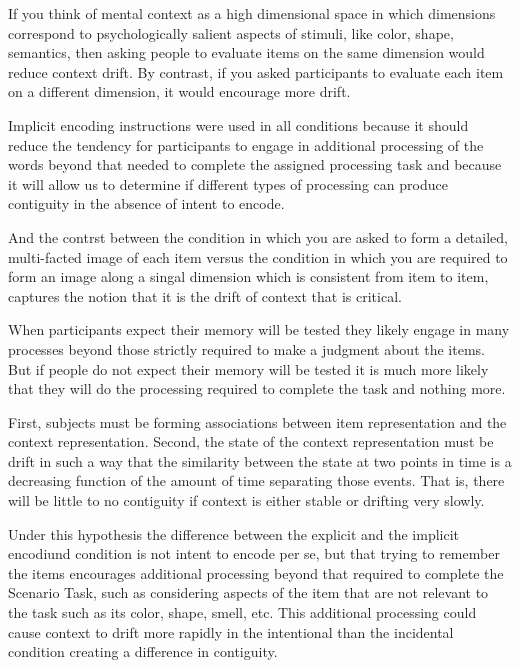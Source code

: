 If you think of mental context as a high dimensional space in which dimensions correspond to psychologically salient aspects of stimuli, like color, shape, semantics, then asking people to evaluate items on the same dimension would reduce context drift. By contrast, if you asked participants to evaluate each item on a different dimension, it would encourage more drift.


Implicit encoding instructions were used in all conditions because it should reduce the tendency for participants to engage in additional processing of the words beyond that needed to complete the assigned processing task and because it will allow us to determine if different types of processing can produce contiguity in the absence of intent to encode.




And the contrst between the condition in which you are asked to form a detailed, multi-facted image of each item versus the condition in which you are required to form an image along a singal dimension which is consistent from item to item, captures the notion that it is the drift of context that is critical.


When participants expect their memory will be tested they likely engage in many processes beyond those strictly required to make a judgment about the items. But if people do not expect their memory will be tested it is much more likely that they will do the processing required to complete the task and nothing more.


First, subjects must be forming associations between item representation and the context representation. Second, the state of the context representation must be drift in such a way that the similarity between the state at two points in time is a decreasing function of the amount of time separating those events. That is, there will be little to no contiguity if context is either stable or drifting very slowly. 





Under this hypothesis the difference between the explicit and the implicit encodiund condition is not intent to encode per se, but that trying to remember the items encourages additional processing beyond that required to complete the Scenario Task, such as considering aspects of the item that are not relevant to the task such as its color, shape, smell, etc. This additional processing could cause context to drift more rapidly in the intentional than the incidental condition creating a difference in contiguity. 


